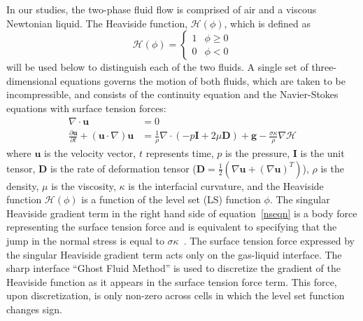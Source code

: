 \documentclass[%
 reprint,
 showkeys,
 amsmath,amssymb,
 aps,
 prfluids,
 onecolumn
]{revtex4-2}
\newcommand{\Hea}{\mathcal{H}}
\newcommand{\vv}{\mathbf}
\newcommand{\bmD}{\vv{D}}
\newcommand{\bmg}{\vv{g}}
\newcommand{\bmI}{\vv{I}}
\newcommand{\bmu}{\vv{u}}
\begin{document}
In our studies,
the two-phase fluid flow is comprised of air and a 
viscous Newtonian liquid.  
The Heaviside function, $\Hea(\phi)$, which is defined as
%
\begin{equation}\label{heavyeqn}
  \Hea(\phi) = \begin{cases}
               1 & \phi \geq 0 \\
               0 & \phi <0 
               \end{cases}
\end{equation}
%
will be used below to distinguish each of the two fluids.  A single set of
three-dimensional equations governs the motion of both fluids, which are taken
to be incompressible, and consists of the continuity equation and the
Navier-Stokes equations with surface tension forces:
%
\begin{align}
  \nabla\cdot\bmu &=0  \label{divu} \\
  \frac{\partial\bmu}{\partial t}+(\bmu\cdot\nabla)\bmu &=
  \frac{1}{\rho}\nabla\cdot(-p\bmI+2\mu\bmD)+\bmg-
  \frac{\sigma\kappa}{\rho}\nabla \Hea  \label{nseqn}
\end{align}
%
%
where $\bmu$ is the velocity vector, $t$ represents time, $p$ is the pressure,
$\bmI$ is the unit tensor, $\bmD$ is the rate of deformation tensor
($\bmD=\frac{1}{2}(\nabla\bmu+(\nabla\bmu)^{T})$), $\rho$ is the density, $\mu$
is the viscosity, $\kappa$ is the interfacial curvature, and the Heaviside
function $\Hea(\phi)$ is a function of the level set (LS) function $\phi$. The
singular Heaviside gradient term in the right hand side of equation~\eqref{nseqn} is a body 
force representing the surface tension force and is equivalent to specifying that the jump 
in the normal stress is equal to
$\sigma\kappa$~\cite{TanguyEtAl2007}. 
{\color{red} The surface tension force expressed 
by the singular Heaviside gradient term acts only on the 
gas-liquid interface. 
The sharp interface ``Ghost Fluid Method'' \cite{kang2000boundary}
is used to discretize the gradient of the Heaviside function as it 
appears in the surface tension force term.  This force, upon discretization,
is only non-zero across cells in which the level set function changes
sign. }
\end{document}
